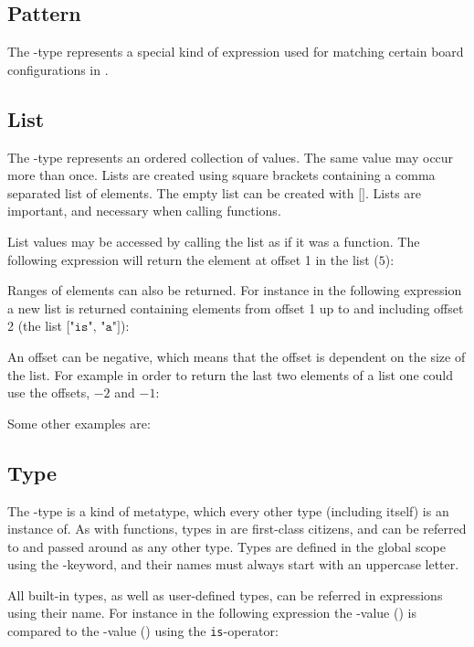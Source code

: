\subsection{Pattern}
The -type represents a special kind of expression used for
matching certain board configurations in \productname{}.

\subsection{List}
The -type represents an ordered collection of values. The same value
may occur more than once. Lists are created using square brackets containing a
comma separated list of elements. The empty list can be created with
$\texttt{[]}$. Lists are important, and necessary when calling functions.

List values may be accessed by calling the list as if it was a function.
The following expression will return the element at offset 1 in the list
($5$):


Ranges of elements can also be returned. For instance in the following
expression a new list is returned containing elements from offset 1 up
to and including offset 2 (the list $\texttt{["is", "a"]}$):


An offset can be negative, which means that the offset is dependent on
the size of the list. For example in order to return the last two elements
of a list one could use the offsets, $-2$ and $-1$:


Some other examples are:


\subsection{Type}
The -type is a kind of metatype, which every other type (including itself)
is an instance of. As with functions,
types in \productname{} are first-class citizens, and can be referred to and passed
around as any other type. Types are defined in the global scope using the
-keyword, and their names must always start with an uppercase letter.

All built-in types, as well as user-defined types, can be referred in expressions using
their name. For instance in the following expression the -value () is compared
to the -value () using the \texttt{is}-operator:

